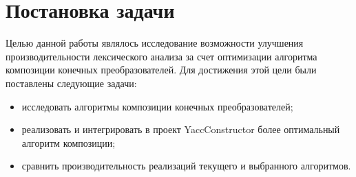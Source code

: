 \section{Постановка задачи}
Целью данной работы являлось исследование возможности улучшения производительности лексического анализа за счет оптимизации алгоритма композиции конечных преобразователей. Для достижения этой цели были поставлены следующие задачи:

\begin{itemize}
\item исследовать алгоритмы композиции конечных преобразователей;
\item реализовать и интегрировать в проект YaccConstructor более оптимальный алгоритм композиции;
\item сравнить производительность реализаций текущего и выбранного алгоритмов.
\end{itemize} 
